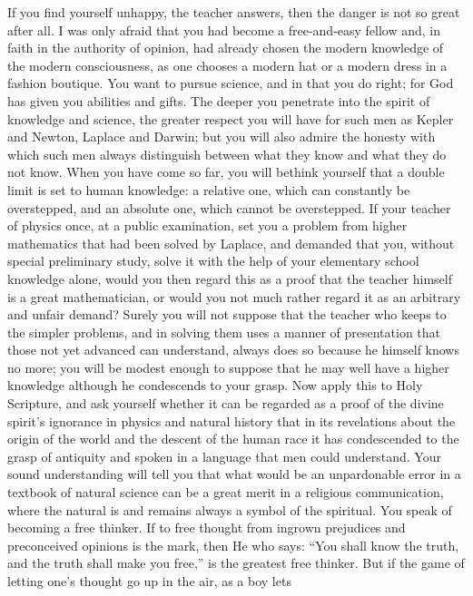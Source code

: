 \documentclass[12pt,a4paper,openany]{book}
\newcommand{\opage}[1]{\marginnote{\footnotesize\textit{[#1]}}}
\begin{document}
If you find yourself unhappy, the teacher answers, then the danger is
not so great after all. I was only afraid that you had become a
free-and-easy fellow and, in faith in the authority of opinion, had
already chosen the modern knowledge of the modern consciousness, as one
chooses a modern hat or a modern dress in a fashion boutique. You want
to pursue science, and in that you do right; for God has given you
abilities and gifts. The deeper you penetrate into the spirit of
knowledge and science, the greater respect you will have for such men as
Kepler and Newton, Laplace and Darwin; but you will also admire the
honesty with which such men always distinguish between what they know
and what they do not know. When you have come so far, you will bethink
yourself that a double limit is set to human knowledge: a \opage{49}relative one,
which can constantly be overstepped, and an absolute one, which cannot be
overstepped. If your teacher of physics once, at a public examination,
set you a problem from higher mathematics that had been solved by
Laplace, and demanded that you, without special preliminary study, solve
it with the help of your elementary school knowledge alone, would you
then regard this as a proof that the teacher himself is a great
mathematician, or would you not much rather regard it as an arbitrary
and unfair demand? Surely you will not suppose that the teacher who keeps
to the simpler problems, and in solving them uses a manner of
presentation that those not yet advanced can understand, always does so
because he himself knows no more; you will be modest enough to suppose
that he may well have a higher knowledge although he condescends to your
grasp. Now apply this to Holy Scripture, and ask yourself whether it can
be regarded as a proof of the divine spirit's ignorance in physics and
natural history %
that in its revelations about the origin of the world and the descent of
the human race it has condescended to the grasp of antiquity and spoken
in a language that men could understand. Your sound understanding will
tell you that what would be an unpardonable error in a textbook of
natural science can be a great merit in a religious communication, where
the natural is and remains always a symbol of the spiritual. You speak of
becoming a free thinker. If to free thought from ingrown prejudices and
preconceived opinions is the mark, then He who says: ``You shall know the
truth, and the truth shall make you free,'' is the greatest free thinker.
But if the game of letting one's \opage{50}thought go up in the air, as a boy lets
\end{document}
